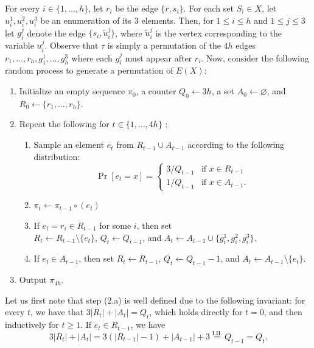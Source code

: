 \documentclass[11pt]{amsart}
\newcommand{\ns}{s}
\newcommand{\nou}{\tilde{u}}
\begin{document}
      For every $i \in \{1, \dots, h\}$, let $r_i$ be the edge $\{r, \ns_i\}$. For each set $S_i \in X$, let $u_i^1, u_i^2, u_i^3$ be an enumeration of its $3$ elements. Then, for $1 \leq i \leq h$ and $1 \leq j \leq 3$ let $g_{i}^j$ denote the edge $\{\ns_i, \nou_i^j\}$, where $\nou_i^j$ is the vertex corresponding to the variable $u_i^j$.
      Observe that $\tau$ is simply a permutation of the $4h$ edges $r_1, \dots, r_h, g_1^1, \dots, g_h^3$ where each $g_{i}^j$ must appear after $r_i$. 
    Now, consider the following random process to generate a permutation of $E(X)$:
    \begin{enumerate}
    
        \item Initialize an empty sequence $\pi_0$, a counter $Q_0 \gets 3h$, a set $A_0 \gets \varnothing$, and $R_0 \gets \{r_1, \ldots, r_h\}$.
        \item Repeat the following for $t \in \{1, \dots, 4h\}$ : 
        \begin{enumerate}
            \item Sample an element $e_t$ from $R_{t-1} \cup A_{t-1}$ according to the following distribution:
            \[
            \Pr[e_t = x] = \begin{cases}
                3/Q_{t-1} & \text{if } x \in R_{t-1}\\
                1/Q_{t-1} & \text{if } x \in A_{t-1}.
            \end{cases}
            \]
            \item $\pi_t \gets \pi_{t-1} \circ (e_t)$
            \item If $e_t = r_i \in R_{t-1}$ for some $i$, then set\\ $R_t \gets R_{t-1} \setminus \{e_{t}\}$,  $Q_t \gets Q_{t-1}$, and $A_t \gets A_{t-1} \cup \{ g_i^1, g_i^2, g_i^3\}$. %
            \item If $e_t \in A_{t-1}$, then set  $R_t \gets R_{t-1}$,  $Q_{t} \gets Q_{t-1} - 1$, and $A_t \gets A_{t-1} \setminus \{e_t\}$.
        \end{enumerate}
        \item Output $\pi_{4h}$.
    \end{enumerate}
    Let us first note that step (2.a) is well defined due to the following invariant: for every $t$, we have that $3|R_t| + |A_t| = Q_t$, which holds directly for $t = 0$, and then inductively for $t \geq 1$. If $e_t \in R_{t-1}$, we have 
    \[
    3|R_t| + |A_t| = 3(|R_{t-1}|- 1) + |A_{t-1}| + 3 \overset{\mathrm{I.H.}}{=} Q_{t-1} = Q_t.
    \]
\end{document}
